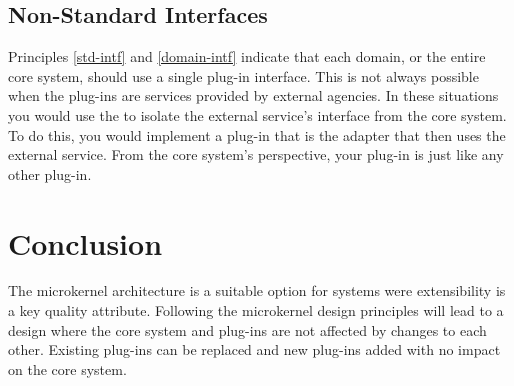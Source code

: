 \subsection{Non-Standard Interfaces}

Principles \ref{std-intf} and \ref{domain-intf} indicate that each domain, or the entire core system, should use a single plug-in interface.
This is not always possible when the plug-ins are services provided by external agencies.
In these situations you would use the 
to isolate the external service's interface from the core system.
To do this, you would implement a plug-in that is the adapter that then uses the external service.
From the core system's perspective, your plug-in is just like any other plug-in.


\section{Conclusion}

The microkernel architecture is a suitable option for systems were extensibility is a key quality attribute.
Following the microkernel design principles will lead to a design where the core system and plug-ins are not affected by changes to each other.
Existing plug-ins can be replaced and new plug-ins added with no impact on the core system.
